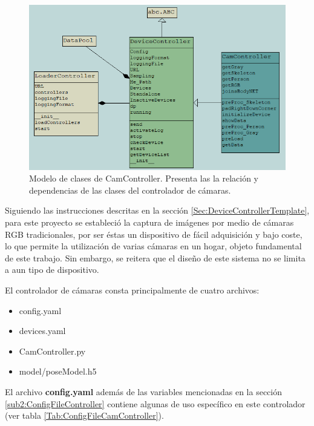     \begin{figure}[ht!]
    	\centering
    	\includegraphics[width=0.9\linewidth]{imgs/04-Construction/04-ControllerClassModel.PNG}
    	\caption[Modelo de clases de CamController]{Modelo de clases de CamController. Presenta las la relación y dependencias de las clases del controlador de cámaras.}
	    \label{fig:CamControllerClassModel}
    \end{figure}%
    
    Siguiendo las instrucciones descritas en la sección \ref{Sec:DeviceControllerTemplate}, para este proyecto se estableció la captura de imágenes por medio de cámaras RGB tradicionales, por ser éstas un dispositivo de fácil adquisición y bajo coste, lo que permite la utilización de varias cámaras en un hogar, objeto fundamental de este trabajo. Sin embargo, se reitera que el diseño de este sistema no se limita a aun tipo de dispositivo.
    
    El controlador de cámaras consta principalmente de cuatro archivos: 
    \begin{itemize}
        \item config.yaml
        \item devices.yaml
        \item CamController.py
        \item model/poseModel.h5
    \end{itemize}
    
    El archivo \textbf{config.yaml} además de las variables mencionadas en la sección \ref{sub2:ConfigFileController} contiene algunas de uso específico en este controlador (ver tabla \ref{Tab:ConfigFileCamController}).
    
